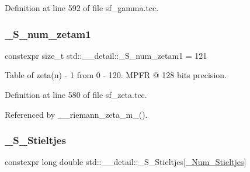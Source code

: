 Definition at line 592 of file sf\+\_\+gamma.\+tcc.

\mbox{\label{namespacestd_1_1____detail_a807e36c2aec3a9f27fdb21726cd464e2}} 
\subsubsection{\texorpdfstring{\+\_\+\+S\+\_\+num\+\_\+zetam1}{\_S\_num\_zetam1}}
{\footnotesize\ttfamily constexpr size\+\_\+t std\+::\+\_\+\+\_\+detail\+::\+\_\+\+S\+\_\+num\+\_\+zetam1 = 121}

Table of zeta(n) -\/ 1 from 0 -\/ 120. M\+P\+FR @ 128 bits precision. 

Definition at line 580 of file sf\+\_\+zeta.\+tcc.



Referenced by \+\_\+\+\_\+riemann\+\_\+zeta\+\_\+m\+\_().

\mbox{\label{namespacestd_1_1____detail_acc0b5ea5ffcc30a404893f434f17a865}} 
\subsubsection{\texorpdfstring{\+\_\+\+S\+\_\+\+Stieltjes}{\_S\_Stieltjes}}
{\footnotesize\ttfamily constexpr long double std\+::\+\_\+\+\_\+detail\+::\+\_\+\+S\+\_\+\+Stieltjes\mbox{[}\hyperlink{namespacestd_1_1____detail_a20c3b4334b0ffa9a5da21768d7830894}{\+\_\+\+Num\+\_\+\+Stieltjes}\mbox{]}}

